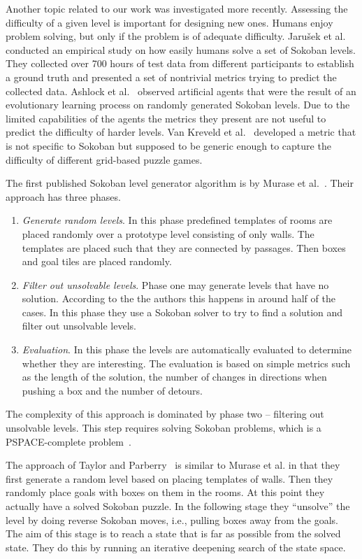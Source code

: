 \documentclass[runningheads]{llncs}
\begin{document}
Another topic related to our work was investigated more recently. Assessing the
difficulty of a given level is important for designing new ones.
Humans enjoy problem solving, but only if the problem is of adequate difficulty.
Jaru{\v s}ek et al.~\cite{jaruvsek2010human}
conducted an empirical study on how easily humans solve a set of Sokoban levels. They collected over 700 hours of test data from different participants to establish a ground truth and presented a set of nontrivial metrics trying to predict the collected data.
Ashlock et al.~\cite{ashlockEvolutionAutomaticAssessment2010}
observed artificial agents that were the result of an evolutionary learning process on randomly generated Sokoban levels. Due to the limited capabilities of the agents the metrics they present are not useful to predict the difficulty of harder levels.
Van Kreveld et al.~\cite{vankreveldAutomatedPuzzleDifficulty2015}
developed a metric that is not specific to Sokoban but supposed to be generic enough to capture the difficulty of different grid-based puzzle games.

The first published Sokoban level generator algorithm is by Murase et al.~\cite{murase1996automatic}.
Their approach has three phases.
\begin{enumerate}
\item \emph{Generate random levels}. In this phase predefined templates of rooms are placed randomly
over a prototype level consisting of only walls.
The templates are placed such that they are connected by passages.
Then boxes and goal tiles are placed randomly.
\item \emph{Filter out unsolvable levels}. Phase one may generate levels that have no solution. According to the the authors this happens in around half of the cases. In this phase they use a Sokoban solver to try to find a solution and filter out unsolvable levels.
\item \emph{Evaluation}. In this phase the levels are automatically evaluated to determine whether
they are interesting. The evaluation is based on simple metrics such as the length of the solution, the number of changes in directions when pushing a box and the number of detours.
\end{enumerate}

The complexity of this approach is dominated by phase two -- filtering out unsolvable levels. This
step requires solving Sokoban problems, which is a PSPACE-complete problem~\cite{culberson1997sokoban}.

The approach of Taylor and Parberry~\cite{taylor2011procedural} is similar to Murase et al.
in that they first generate a random level based on placing templates of walls. Then they
randomly place goals with boxes on them in the rooms. At this point they
actually have a solved Sokoban
puzzle. In the following stage they ``unsolve'' the level by doing reverse Sokoban moves, i.e.,
pulling boxes away from the goals. The aim of this stage is to reach a state that is far as
possible from the solved state. They do this by running an iterative deepening search of the
state space.
\end{document}
